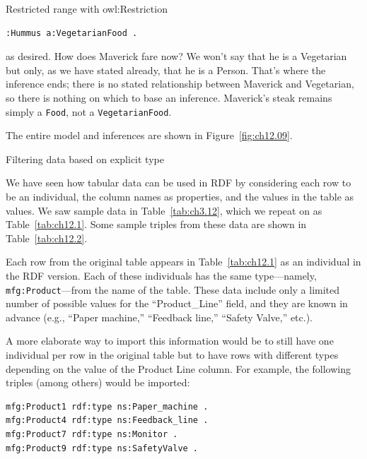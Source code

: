 \begin{challenge}{Restricted range with owl:Restriction}
\begin{lstlisting}
:Hummus a:VegetarianFood .
\end{lstlisting}

as desired. How does Maverick fare now? We won't say that he is a
Vegetarian but only, as we have stated already, that he is a Person.
That's where the inference ends; there is no stated relationship between
Maverick and Vegetarian, so there is nothing on which to base an
inference. Maverick's steak remains simply a \texttt{Food}, not a \texttt{VegetarianFood}.

The entire model and inferences are shown in Figure~\ref{fig:ch12.09}.
\end{challenge}

\begin{challenge}{Filtering data based on explicit type}
\label{chal:27x}

We have seen how tabular data can be used in RDF by considering each row
to be an individual, the column names as properties, and the values in
the table as values. We saw sample data in Table~\ref{tab:ch3.12}, which we repeat
on  as Table~\ref{tab:ch12.1}. Some sample triples from these data are shown
in Table~\ref{tab:ch12.2}.

Each row from the original table appears in Table~\ref{tab:ch12.1} as an individual
in the RDF version. Each of these individuals has the same
type---namely, \texttt{mfg:Product}---from the name of the table. These data
include only a limited number of possible values for the
``Product\_Line'' field, and they are known in advance (e.g., ``Paper
machine,'' ``Feedback line,'' ``Safety Valve,'' etc.).

A more elaborate way to import this information would be to still have
one individual per row in the original table but to have rows with
different types depending on the value of the Product Line column. For
example, the following triples (among others) would be imported:

\begin{lstlisting}
mfg:Product1 rdf:type ns:Paper_machine .
mfg:Product4 rdf:type ns:Feedback_line .
mfg:Product7 rdf:type ns:Monitor .
mfg:Product9 rdf:type ns:SafetyValve .
\end{lstlisting}



\end{challenge}
